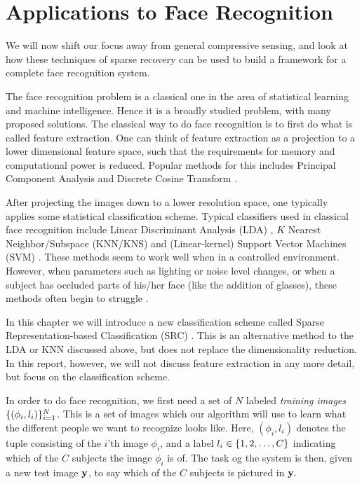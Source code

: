 \chapter{Applications to Face Recognition} \label{sec:applications}
We will now shift our focus away from general compressive sensing, and look at how these techniques of sparse recovery can be used to build a framework for a complete face recognition system. 

The face recognition problem is a classical one in the area of statistical learning and machine intelligence. Hence it is a broadly studied problem, with many proposed solutions. The classical way to do face recognition is to first do what is called feature extraction. One can think of feature extraction as a projection to a lower dimensional feature space, such that the requirements for memory and computational power is reduced. Popular methods for this includes Principal Component Analysis and Discrete Cosine Transform \cite{bhat2014performance}.

After projecting the images down to a lower resolution space, one typically applies some statistical classification scheme. Typical classifiers used in classical face recognition include  Linear Discriminant Analysis (LDA) \cite{bhat2014performance}, $ K $ Nearest Neighbor/Subspace (KNN/KNS) \cite{lee2005acquiring} and (Linear-kernel) Support Vector Machines (SVM) \cite{wright09facerecog}. These methods seem to work well when in a controlled environment. However, when parameters such as lighting or noise level changes, or when a subject has occluded parts of his/her face (like the addition of glasses), these methods often begin to struggle \cite{eldar12theoryapplic}.

In this chapter we will introduce a new classification scheme called Sparse Representation-based Classification (SRC) \cite{wright09facerecog}. This is an alternative method to the LDA or KNN discussed above, but does not replace the dimensionality reduction. In this report, however, we will not discuss feature extraction in any more detail, but focus on the classification scheme. 

In order to do face recognition, we first need a set of $ N $ labeled \textit{training images} $ \{(\phi_{i}, l_{i})\}_{i=1}^{N} $. This is a set of images which our algorithm will use to learn what the different people we want to recognize looks like. Here, $ (\phi_{i}, l_{i}) $ denotes the tuple consisting of the $ i $'th image $ \phi_{i} $, and a label $ l_{i} \in \{1, 2, \ldots, C\} $ indicating which of the $ C $ subjects the image $ \phi_{i} $ is of. The task og the system is then, given a new test image $ \mathbf{y} $, to say which of the $ C $ subjects is pictured in $ \mathbf{y}. $




